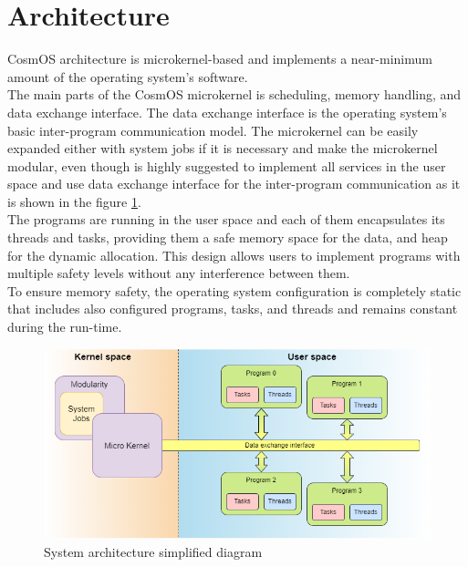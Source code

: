 \section{Architecture}
\indent CosmOS architecture is microkernel-based and implements a near-minimum amount of the operating system's software.\\
\indent The main parts of the CosmOS microkernel is scheduling, memory handling, and data exchange interface. The data exchange interface is the operating system's basic inter-program communication model. The microkernel can be easily expanded either with system jobs if it is necessary and make the microkernel modular, even though is highly suggested to implement all services in the user space and use data exchange interface for the inter-program communication as it is shown in the figure \ref{fig:systemArchitecture}.\\
\indent The programs are running in the user space and each of them encapsulates its threads and tasks, providing them a safe memory space for the data, and heap for the dynamic allocation. This design allows users to implement programs with multiple safety levels without any interference between them. \\
\indent To ensure memory safety, the operating system configuration is completely static that includes also configured programs, tasks, and threads and remains constant during the run-time.
\begin{figure}[H]
\begin{center}
\includegraphics[width=1\textwidth]{images/system_architecture.png}
\caption{System architecture simplified diagram}
\label{fig:systemArchitecture}
\end{center}
\end{figure}


